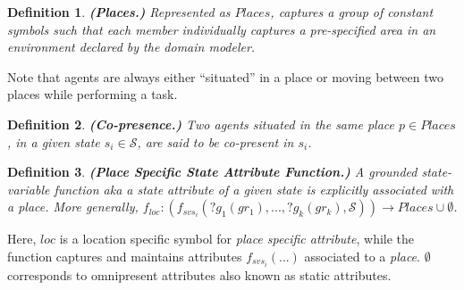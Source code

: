 \documentclass[letterpaper]{article} %
\newtheorem{definition}{Definition}
\begin{document}
\begin{definition} \label{def:places}
\textbf{(Places.)} Represented as $\mathit{Places}$, captures a group of constant symbols such that each member individually captures a pre-specified area in an environment declared by the domain modeler.  
\end{definition}


Note that agents are always either ``situated'' in a place or moving between two places while performing a task. 

\begin{definition} \label{def:copresence}
\textbf{(Co-presence.)} Two agents situated in the same place $p \in \mathit{Places}$, in a given state $s_i \in \mathcal{S}$, are said to be \textit{co-present} in $s_i$.
\end{definition}


\begin{definition} \label{def:pssav}
    \textbf{(Place Specific State Attribute Function.)} A {\em grounded} state-variable function {\em aka} a state attribute of a given state is explicitly associated with a place. More generally, 
    $f_{loc}: (f_{svs_i}(?g_1(gr_1),...,?g_k(gr_k),\mathcal{S})) \rightarrow Places \cup \emptyset$.
\end{definition}
Here, $\mathit{loc}$ is a location specific symbol for {\em place specific attribute}, while the function captures and maintains attributes $f_{svs_i}(...)$ associated to a \textit{place}. $\emptyset$ corresponds to omnipresent attributes also known as static attributes.
\end{document}

